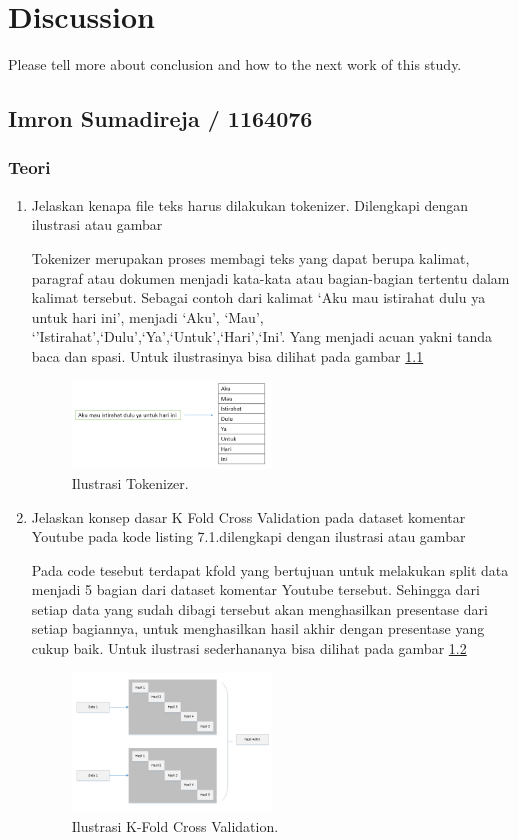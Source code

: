 \chapter{Discussion}
Please tell more about conclusion and how to the next work of this study.

\section{Imron Sumadireja / 1164076}
\subsection{Teori}
\begin{enumerate}
\item Jelaskan kenapa file teks harus dilakukan tokenizer. Dilengkapi dengan ilustrasi atau gambar \par
Tokenizer merupakan proses membagi teks yang dapat berupa kalimat, paragraf atau dokumen menjadi kata-kata atau bagian-bagian tertentu dalam kalimat tersebut. Sebagai contoh dari kalimat `Aku mau istirahat dulu ya untuk hari ini', menjadi `Aku', `Mau', `'Istirahat',`Dulu',`Ya',`Untuk',`Hari',`Ini'. Yang menjadi acuan yakni tanda baca dan spasi. Untuk ilustrasinya bisa dilihat pada gambar \ref{toke1}
		\begin{figure}[!htbp]
		\centerline{\includegraphics[width=0.5\textwidth]{figures/im/toke1.png}}
		\caption{Ilustrasi Tokenizer.}
		\label{toke1}
		\end{figure}

\item Jelaskan konsep dasar K Fold Cross Validation pada dataset komentar Youtube pada kode listing 7.1.dilengkapi dengan ilustrasi atau gambar \par

Pada code tesebut terdapat kfold yang bertujuan untuk melakukan split data menjadi 5 bagian dari dataset komentar Youtube tersebut. Sehingga dari setiap data yang sudah dibagi tersebut akan menghasilkan presentase dari setiap bagiannya, untuk menghasilkan hasil akhir dengan presentase yang cukup baik. Untuk ilustrasi sederhananya bisa dilihat pada gambar \ref{toke2}
		\begin{figure}[!htbp]
		\centerline{\includegraphics[width=0.5\textwidth]{figures/im/toke2.png}}
		\caption{Ilustrasi K-Fold Cross Validation.}
		\label{toke2}
		\end{figure}


\end{enumerate}
